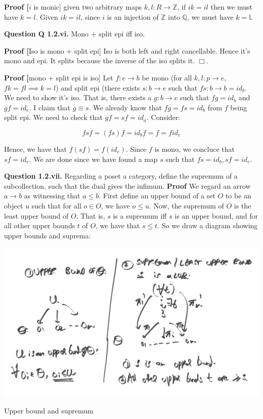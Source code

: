 \documentclass[11pt]{report}
\newcommand{\Z}{\ensuremath{\mathbb{Z}}}
\newcommand{\Q}{\ensuremath{\mathbb{Q}}}
\def\qed{$\Box$}
\newcommand*{\question}[1]{\leavevmode\newline \textbf{Question #1.}}
\newcommand*{\proof}[1]{\leavevmode\newline \textbf{Proof #1}}
\begin{document}
\proof[$i$ is monic]
given two arbitrary maps $k, l: R \rightarrow \Z$, if $ik = il$ then we must have $k = l$. Given $ik = il$, since $i$
is an injection of $\Z$ into $\Q$, we must have $k = $l.

\question{Q 1.2.vi} Mono + split epi iff iso.


\proof[Iso is mono + split epi]
Iso is both left and right cancellable. Hence it's mono and epi. It splits because the inverse of the iso splits it. \qed.


\proof[mono + split epi is iso]
Let $f: e \rightarrow b$ be mono (for all $k, l: p \to e$, $fk = fl \implies k = l$)
and split epi (there exists $s: b \rightarrow e$ such that $fs: b \rightarrow b = id_b$.
We need to show it's iso. That is, there exists a $g: b \rightarrow e$ such that $fg = id_b$ and $gf = id_e$.
I claim that $g \equiv s$. We already know that $fg = fs = id_b$ from $f$ being split epi. We need to 
check that $gf = sf = id_a$. Consider:

$$fsf = (fs)f = id_b f = f = f id_e$$

Hence, we have that $f(sf) = f(id_e)$. Since $f$ is mono, we concluce that $sf = id_e$. We are done 
since we have found a map $s$ such that $fs = id_b, sf = id_e$.


\question{1.2.vii} Regarding a poset a category, define the supremum of a subcollection, such that the dual gives the infimum.
\proof{}  We regard an arrow $a \to b$ as witnessing that $a \leq b$. First define an upper bound of a set $O$
to be an object $u$ such that for all $o \in O$, we have $o \leq u$. Now, the supremum of $O$ is the least upper bound
of $O$. That is, $s$ is a supremum iff $s$ is an upper bound, and for all other upper bounds $t$ of $O$, we have that $s \leq t$.
So we draw a diagram showing upper bounds and suprema:

\begin{minipage}{\textwidth}
\includegraphics[width=\textwidth]{ch1/sup.png}
    \begin{center}Upper bound and supremum\end{center}
\end{minipage}
\end{document}
